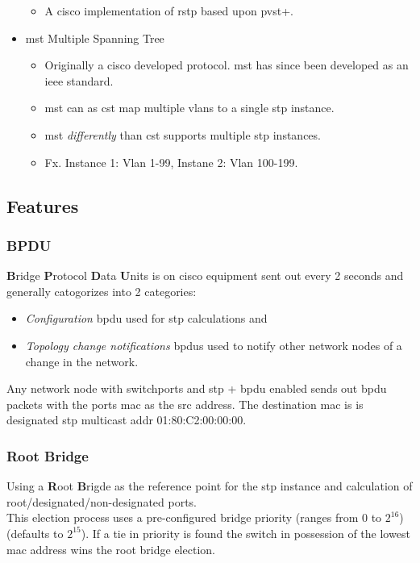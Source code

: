 \begin{itemize}
    \begin{itemize}
        \item A cisco implementation of \gls{rstp} based upon \gls{pvst+}.
    \end{itemize}
    \item \gls{mst} {\scriptsize Multiple Spanning Tree}
    \begin{itemize}
        \item Originally a cisco developed protocol. \gls{mst} has since been developed as an \gls{ieee} standard.
        \item \gls{mst} can as \gls{cst} map multiple vlans to a single \gls{stp} instance.
        \item \gls{mst} \textit{differently} than \gls{cst} supports multiple \gls{stp} instances.
        \item Fx. Instance 1: Vlan 1-99, Instane 2: Vlan 100-199.
    \end{itemize}
\end{itemize}

\subsection{Features}

\subsubsection{BPDU}
\textbf{B}ridge \textbf{P}rotocol \textbf{D}ata \textbf{U}nits is on cisco equipment sent out every 2 seconds and generally catogorizes into 2 categories:
\begin{itemize}
    \item \textit{Configuration} \gls{bpdu} used for \gls{stp} calculations and
    \item \textit{Topology change notifications} \gls{bpdu}s used to notify other network nodes of a change in the network.
\end{itemize}

Any network node with switchports and \gls{stp} + \gls{bpdu} enabled sends out \gls{bpdu} packets with the ports \gls{mac} as the src address. The destination \gls{mac} is is designated \gls{stp} multicast addr 01:80:C2:00:00:00.

\subsubsection{Root Bridge}
Using a \textbf{R}oot \textbf{B}rigde as the reference point for the \gls{stp} instance and calculation of root/designated/non-designated ports.\\This election process uses a pre-configured bridge priority (ranges from $0$ to $2^{16}$) (defaults to $2^{15}$). If a tie in priority is found the switch in possession of the lowest \gls{mac} address wins the root bridge election.

